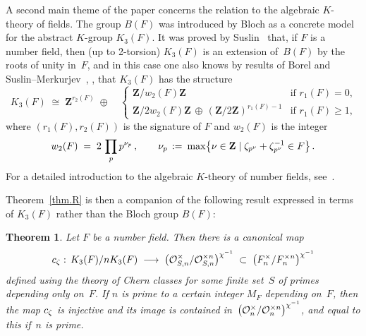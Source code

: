 \documentclass[12pt,reqno]{amsart}
\newtheorem{theorem}{Theorem}[section]
\theoremstyle{definition}
\newcommand{\changed}[1]{{#1}}
\newcommand{\rmk}[1]{{\color{blue} {\rm [#1]}}}
\def\be{\begin{equation}}
\def\ee{\end{equation}}
\def\={\;=\;}
\def\Z{\mathbf Z}   %
\def\map{\;\longrightarrow\;}
\def\nn{n}
\def\OL{\mathcal{O}}
\begin{document}
A second main theme of the paper concerns the relation to the algebraic 
$K$-theory of fields. The group $B(F)$ was introduced by Bloch as a concrete 
model for the abstract \hbox{$K$-group} $K_3(F)$. It was proved by 
Suslin~\cite{Suslintwo} that, if $F$ is a number field, then 
(up to \hbox{2-torsion}) $K_3(F)$ is an extension of~$B(F)$ by the roots 
of unity in~$F$, and in this case one also knows by results of
Borel and Suslin--Merkurjev~\cite{SuslinTorsion}, \cite{Suslin}, \cite{Weibel} 
that $K_3(F)$ has the structure
\be
\label{K3F} 
K_3(F) \;\cong\; \Z^{r_2(F)}\;\oplus\quad 
\begin{cases} \Z/w_2(F)\Z & \text{if $r_1(F)=0$,}
\\ \Z/2w_2(F)\Z \,\oplus\,(\Z/2\Z)^{r_1(F)-1}& \text{if $r_1(F)\ge1$,}
\end{cases}
\ee
where $(r_1(F),r_2(F))$ is the signature of $F$ and $w_2(F)$ is the integer
\be 
\label{eq.w2F} 
w_2(F) \=  2\,\prod_pp^{\nu_p}\,,\qquad  
\nu_p \,:=\:\max\bigl\{\nu\in\Z\mid\z_{p^\nu}+\z_{p^\nu}\i\in F\bigr\}\,. 
\ee
For a detailed introduction to the algebraic $K$-theory of number 
fields, see~\cite{Weibel}.

Theorem~\ref{thm.R} is then a companion of the following result \changed{
expressed in terms of $K_3(F)$ rather than the Bloch group $B(F)$}:

\begin{theorem}
\label{thm.c}
Let $F$ be a number field. Then there is a canonical map 
\be
\label{eq.cmap}  
c_\z:\, K_3(F)/\nn K_3(F)\map 
\bigl(\OL_{S,\nn}^{\times}/\OL_{S,\nn}^{\times \nn}\bigr)^{\chi\i}
\;\subset\;\bigl(F_\nn^{\times}/F_\nn^{\times \nn}\bigr)^{\chi\i}
\ee
defined using the theory of Chern classes
for some finite set~$S$ of primes depending only on~$F$. If $\nn$ is prime 
to a certain integer $M_F$ depending on~$F$, then the map \changed{$c_\zeta$} is
injective and its image is contained 
in~$\bigl(\OL_\nn^{\times}/\OL_\nn^{\times \nn}\bigr)^{\chi\i}$, and equal to this 
if~$\nn$ is prime.
\end{theorem}
\end{document}
